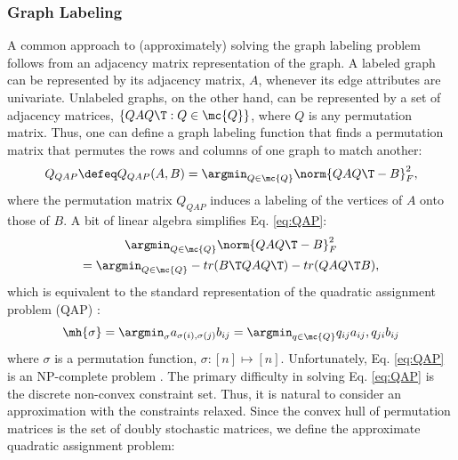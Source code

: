 \documentclass[10pt,journal,cspaper,compsoc]{IEEEtran}
\begin{document}
\subsubsection{Graph Labeling} %
\label{ssub:graph_matching}

A common approach to (approximately) solving the graph labeling problem follows from an adjacency matrix representation of the graph.  A labeled graph can be represented by its adjacency matrix, $A$, whenever its edge attributes are univariate.  Unlabeled graphs, on the other hand, can be represented by a set of adjacency matrices, $\{QAQ\T : Q \in \mc{Q}\}$, where $Q$ is any permutation matrix. Thus, one can define a graph labeling function that finds a permutation matrix that permutes the rows and columns of one graph to match another: %
 \begin{align} \label{eq:QAP}
	Q_{QAP} \defeq Q_{QAP}(A,B)= \argmin_{Q \in \mc{Q}} \norm{Q A Q\T - B}^2_F,
\end{align}
where the permutation matrix $Q_{QAP}$ induces a labeling of the vertices of $A$ onto those of $B$. A bit of linear algebra simplifies Eq. \eqref{eq:QAP}: %
\begin{multline} \label{eq:qap}
	\argmin_{Q \in \mc{Q}} \norm{Q A Q\T - B}^2_F \\
	= \argmin_{Q \in \mc{Q}} - tr(B\T QAQ\T) - tr(QAQ\T B),			
\end{multline}
which is equivalent to the standard representation of the quadratic assignment problem (QAP) \cite{Conte2004}:
\begin{align}
	\mh{\sigma}= \argmin_{\sigma} a_{\sigma(i), \sigma(j)} b_{ij} = \argmin_{q \in \mc{Q}} q_{ij} a_{ij}, q_{ji} b_{ij}
\end{align}
where $\sigma$ is a permutation function, $\sigma: [n] \mapsto [n]$.  Unfortunately, Eq. \eqref{eq:QAP} is an NP-complete problem \cite{Garey1979a}. The primary difficulty in solving Eq. \eqref{eq:QAP} is the discrete non-convex constraint set.  Thus, it is natural to consider an approximation with the constraints relaxed.  Since the convex hull of permutation matrices is the set of doubly stochastic matrices, we define the approximate quadratic assignment problem:
\end{document}
